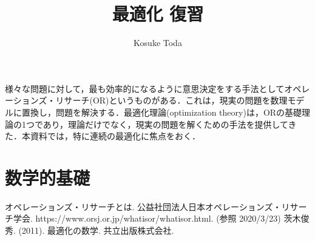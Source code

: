 \documentclass[dvipdfmx]{jsarticle}
\title{最適化 復習}
\author{Kosuke Toda}
\date{}
\begin{document}
\maketitle
様々な問題に対して，最も効率的になるように意思決定をする手法としてオペレーションズ・リサーチ(OR)というものがある\cite{or}．これは，現実の問題を数理モデルに置換し，問題を解決する．最適化理論(optimization theory)は，ORの基礎理論の1つであり，理論だけでなく，現実の問題を解くための手法を提供してきた\cite{opt}．本資料では，特に連続の最適化に焦点をおく．

\section{数学的基礎}

\begin{thebibliography}{99}
 オペレーションズ・リサーチとは. 公益社団法人日本オペレーションズ・リサーチ学会. https://www.orsj.or.jp/whatisor/whatisor.html. (参照 2020/3/23)
 茨木俊秀. (2011). 最適化の数学. 共立出版株式会社.
\end{thebibliography}
\end{document}
